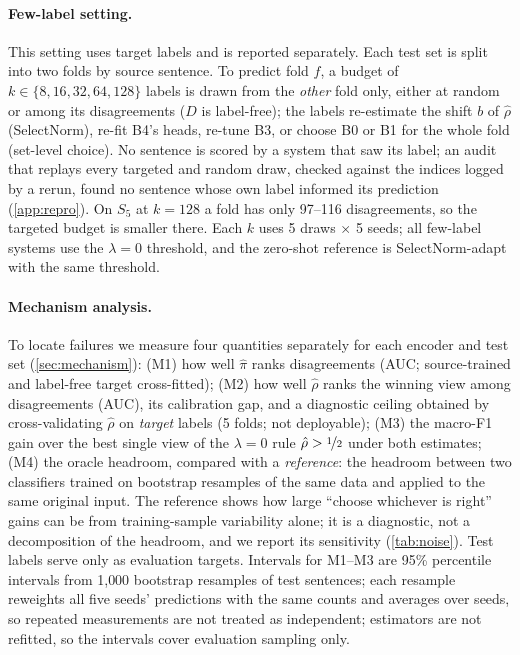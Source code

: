 \paragraph{Few-label setting.}
This setting uses target labels and is reported separately. Each test set is split into two folds by source sentence. To predict fold $f$, a budget of $k\in\{8,16,32,64,128\}$ labels is drawn from the \emph{other} fold only, either at random or among its disagreements ($D$ is label-free); the labels re-estimate the shift $b$ of $\hat\rho$ (SelectNorm), re-fit B4's heads, re-tune B3, or choose B0 or B1 for the whole fold (set-level choice). No sentence is scored by a system that saw its label; an audit that replays every targeted and random draw, checked against the indices logged by a rerun, found no sentence whose own label informed its prediction (\cref{app:repro}). On $S_5$ at $k{=}128$ a fold has only 97--116 disagreements, so the targeted budget is smaller there. Each $k$ uses 5 draws $\times$ 5 seeds; all few-label systems use the $\lambda=0$ threshold, and the zero-shot reference is SelectNorm-adapt with the same threshold.

\paragraph{Mechanism analysis.}
To locate failures we measure four quantities separately for each encoder and test set (\cref{sec:mechanism}): (M1) how well $\hat\pi$ ranks disagreements (AUC; source-trained and label-free target cross-fitted); (M2) how well $\hat\rho$ ranks the winning view among disagreements (AUC), its calibration gap, and a diagnostic ceiling obtained by cross-validating $\hat\rho$ on \emph{target} labels (5 folds; not deployable); (M3) the macro-F1 gain over the best single view of the $\lambda{=}0$ rule $\hat\rho>\nicefrac12$ under both estimates; (M4) the oracle headroom, compared with a \emph{reference}: the headroom between two classifiers trained on bootstrap resamples of the same data and applied to the same original input. The reference shows how large ``choose whichever is right'' gains can be from training-sample variability alone; it is a diagnostic, not a decomposition of the headroom, and we report its sensitivity (\cref{tab:noise}). Test labels serve only as evaluation targets. Intervals for M1--M3 are 95\% percentile intervals from 1{,}000 bootstrap resamples of test sentences; each resample reweights all five seeds' predictions with the same counts and averages over seeds, so repeated measurements are not treated as independent; estimators are not refitted, so the intervals cover evaluation sampling only.

